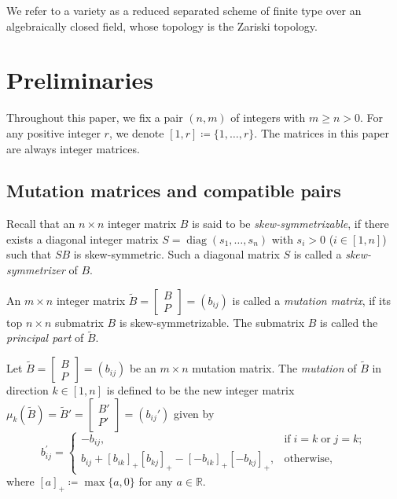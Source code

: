 \documentclass[12pt]{amsart}
\theoremstyle{definition}
\theoremstyle{remark}
\numberwithin{equation}{section}
\newcommand{\diag}{\operatorname{diag}}
\begin{document}
 We refer to a variety as a reduced separated scheme of finite type over an algebraically closed field, whose topology is the Zariski topology.



\section{Preliminaries}\label{sec2}

Throughout this paper, we fix a pair $(n,m)$ of integers with $m\geq n > 0$. For any positive integer $r$, we denote $[1,r] \coloneqq   \{1,\ldots,r\}$.
The matrices in this paper are always integer matrices.
\subsection{Mutation matrices and compatible pairs}

Recall that an $n\times n$ integer matrix $B$ is said to be {\em skew-symmetrizable}, if there exists a diagonal integer matrix $S=\diag(s_1,\ldots,s_n)$ with $s_i>0$ ($i\in[1,n]$) such that $SB$ is skew-symmetric. Such a diagonal matrix $S$ is called a {\em skew-symmetrizer} of $B$.


An $m\times n$ integer matrix $\widetilde B=\begin{bmatrix}
       B\\ P
   \end{bmatrix}=(b_{ij})$ is called a {\em mutation matrix}, if its top $n\times n$ submatrix $B$ is skew-symmetrizable. The submatrix $B$ is called the {\em principal part} of $\widetilde B$.


Let $\widetilde B=\begin{bmatrix}
       B\\ P
   \end{bmatrix}=(b_{ij})$ be an $m\times n$ mutation matrix. The {\em mutation} of $\widetilde B$
   in direction $k\in[1,n]$ is
defined to be the new integer matrix $\mu_k(\widetilde B)=\widetilde B'=\begin{bmatrix}
       B'\\ P'
   \end{bmatrix}=(b_{ij}')$ given by
\begin{equation}\label{eqn:b-mutation}
b_{ij}^\prime=\begin{cases}-b_{ij}, & \text{if}\;i=k\;\text{or}\;j=k;\\
 b_{ij}+[b_{ik}]_+[b_{kj}]_+-[-b_{ik}]_+[-b_{kj}]_+,&\text{otherwise},\end{cases}
\end{equation}
where $[a]_+ \coloneqq   \max\{a,0\}$ for any $a\in\mathbb R$.
\end{document}
